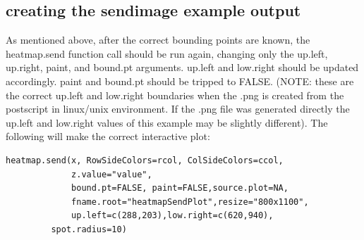 \documentclass[]{article}
\begin{document}
\subsection{creating the sendimage example output}

\indent As mentioned above, after the correct bounding points are known, the heatmap.send function call should be run again, changing only the up.left, up.right, paint, and bound.pt arguments. up.left and low.right should be updated accordingly. paint and bound.pt should be tripped to FALSE. (NOTE: these are the correct up.left and low.right boundaries when the .png is created from the postscript in linux/unix environment. If the .png file was generated directly the up.left and low.right values of this example may be slightly different).  The following will make the correct interactive plot:
\begin{verbatim}
heatmap.send(x, RowSideColors=rcol, ColSideColors=ccol,
             z.value="value",
             bound.pt=FALSE, paint=FALSE,source.plot=NA,
             fname.root="heatmapSendPlot",resize="800x1100",
             up.left=c(288,203),low.right=c(620,940),
	     spot.radius=10)

\end{verbatim}
\end{document}

